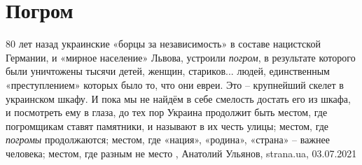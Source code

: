  
 
 
 
 
\chapter{Погром}

80 лет назад украинские «борцы за независимость» в составе нацистской Германии,
и «мирное население» Львова, устроили \emph{погром}, в результате которого были
уничтожены тысячи детей, женщин, стариков... людей, единственным
«преступлением» которых было то, что они евреи.
Это – крупнейший скелет в украинском шкафу. И пока мы не найдём в себе смелость
достать его из шкафа, и посмотреть ему в глаза, до тех пор Украина продолжит
быть местом, где погромщикам ставят памятники, и называют в их честь улицы;
местом, где \emph{погромы} продолжаются; местом, где «нация», «родина», «страна» –
важнее человека; местом, где разным не место
, 
Анатолий Ульянов, strana.ua, 03.07.2021

